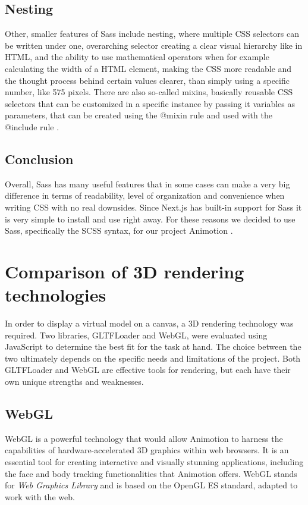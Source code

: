 \subsection{Nesting}
Other, smaller features of Sass include nesting, where multiple CSS selectors can be written under one, overarching selector creating a
clear visual hierarchy like in HTML, and the ability to use mathematical operators when for example calculating the width of a HTML
element, making the CSS more readable and the thought process behind certain values clearer, than simply using a specific number, like
575 pixels. There are also so-called mixins, basically reusable CSS selectors that can be customized in a specific instance by passing it
variables as parameters, that can be created using the @mixin rule and used with the @include rule \cite{SassFeatures}.
\\
\subsection{Conclusion}
Overall, Sass has many useful features that in some cases can make a very big difference in terms of readability, level of organization and
convenience when writing CSS with no real downsides. Since Next.js has built-in support for Sass it is very simple to install and use right
away. For these reasons we decided to use Sass, specifically the SCSS syntax, for our project Animotion \cite{NextjsCSSSupport}.
\\
\section{Comparison of 3D rendering technologies}
In order to display a virtual model on a canvas, a 3D rendering technology was required. Two libraries, 
GLTFLoader and WebGL, were evaluated using JavaScript to determine the best fit for the task at hand. 
The choice between the two ultimately depends on the specific needs and limitations of the project. 
Both GLTFLoader and WebGL are effective tools for rendering, but each have their own 
unique strengths and weaknesses.

\subsection{WebGL}
WebGL is a powerful technology that would allow Animotion to harness the capabilities of hardware-accelerated 3D graphics within web browsers. 
It is an essential tool for creating interactive and visually stunning applications, including the face and body tracking 
functionalities that Animotion offers. WebGL stands for \emph{Web Graphics Library} and is based on the OpenGL 
ES standard, adapted to work with the web. \cite{WebGL}

